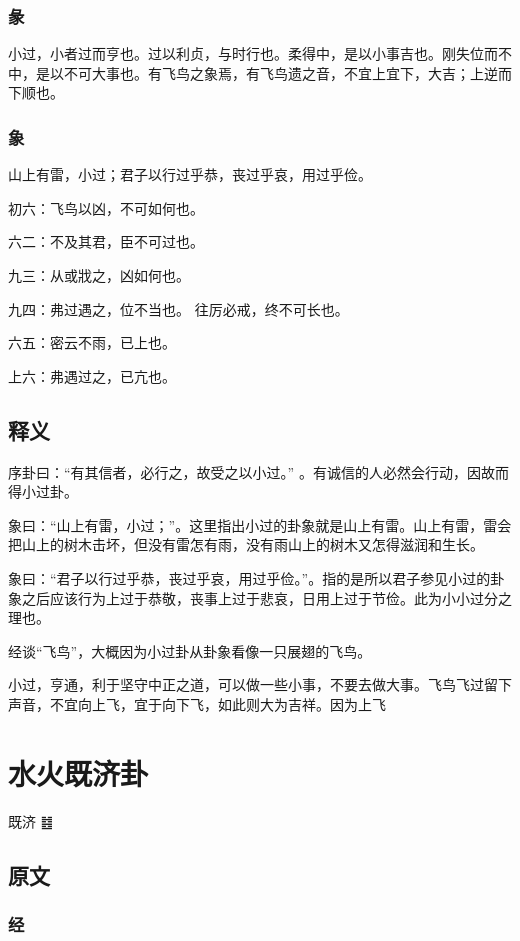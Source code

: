 \documentclass[12pt,oneside]{book}
\begin{document}
\subsection{彖}
小过，小者过而亨也。过以利贞，与时行也。柔得中，是以小事吉也。刚失位而不中，是以不可大事也。有飞鸟之象焉，有飞鸟遗之音，不宜上宜下，大吉；上逆而下顺也。

\subsection{象}
山上有雷，小过；君子以行过乎恭，丧过乎哀，用过乎俭。

初六：飞鸟以凶，不可如何也。

六二：不及其君，臣不可过也。

九三：从或戕之，凶如何也。

九四：弗过遇之，位不当也。 往厉必戒，终不可长也。

六五：密云不雨，已上也。

上六：弗遇过之，已亢也。

\section{释义}
序卦曰：“有其信者，必行之，故受之以小过。” 。有诚信的人必然会行动，因故而得小过卦。

象曰：“山上有雷，小过；”。这里指出小过的卦象就是山上有雷。山上有雷，雷会把山上的树木击坏，但没有雷怎有雨，没有雨山上的树木又怎得滋润和生长。

象曰：“君子以行过乎恭，丧过乎哀，用过乎俭。”。指的是所以君子参见小过的卦象之后应该行为上过于恭敬，丧事上过于悲哀，日用上过于节俭。此为小小过分之理也。

经谈“飞鸟”，大概因为小过卦从卦象看像一只展翅的飞鸟。

小过，亨通，利于坚守中正之道，可以做一些小事，不要去做大事。飞鸟飞过留下声音，不宜向上飞，宜于向下飞，如此则大为吉祥。因为上飞




\chapter{水火既济卦}
既济 {\Large ䷾}
\section{原文}

\subsection{经}
\end{document}
